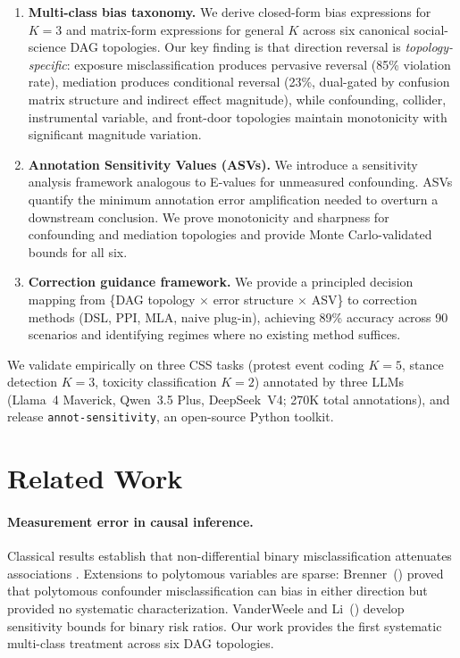 \documentclass[11pt,letterpaper]{article}
\begin{document}
\begin{enumerate}[leftmargin=*,nosep]
\item \textbf{Multi-class bias taxonomy.}
We derive closed-form bias expressions for $K=3$ and matrix-form expressions for general $K$ across six canonical social-science DAG topologies.
Our key finding is that direction reversal is \emph{topology-specific}: exposure misclassification produces pervasive reversal (85\% violation rate), mediation produces conditional reversal (23\%, dual-gated by confusion matrix structure and indirect effect magnitude), while confounding, collider, instrumental variable, and front-door topologies maintain monotonicity with significant magnitude variation.

\item \textbf{Annotation Sensitivity Values (ASVs).}
We introduce a sensitivity analysis framework analogous to E-values for unmeasured confounding. ASVs quantify the minimum annotation error amplification needed to overturn a downstream conclusion.
We prove monotonicity and sharpness for confounding and mediation topologies and provide Monte Carlo-validated bounds for all six.

\item \textbf{Correction guidance framework.}
We provide a principled decision mapping from \{DAG topology $\times$ error structure $\times$ ASV\} to correction methods (DSL, PPI, MLA, naive plug-in), achieving 89\% accuracy across 90 scenarios and identifying regimes where no existing method suffices.
\end{enumerate}

We validate empirically on three CSS tasks (protest event coding $K=5$, stance detection $K=3$, toxicity classification $K=2$) annotated by three LLMs (Llama~4 Maverick, Qwen~3.5 Plus, DeepSeek~V4; 270K total annotations), and release \texttt{annot-sensitivity}, an open-source Python toolkit.

\section{Related Work}

\paragraph{Measurement error in causal inference.}
Classical results establish that non-differential binary misclassification attenuates associations \cite{bross1954,carroll2006}.
Extensions to polytomous variables are sparse: Brenner~(\citeyear{brenner1993}) proved that polytomous confounder misclassification can bias in either direction but provided no systematic characterization.
VanderWeele and Li~(\citeyear{vanderweele2019}) develop sensitivity bounds for binary risk ratios.
Our work provides the first systematic multi-class treatment across six DAG topologies.
\end{document}
